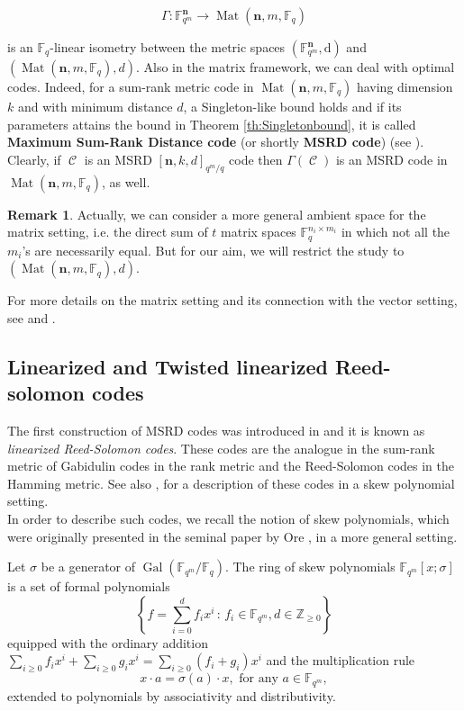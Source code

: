 \documentclass[11pt]{amsart}
\DeclareMathOperator{\C}{\mathcal{C}}
\DeclareMathOperator{\Gal}{Gal}
\DeclareMathOperator{\Mat}{Mat}
\theoremstyle{definition}
\newtheorem{remark}[theorem]{Remark}
\newcommand{\F}{{\mathbb F}}
\newcommand{\Z}{{\mathbb Z}}
\newcommand{\bfn}{\mathbf {n}}
\newcommand{\fq}{{\mathbb F}_{q}}
\newcommand{\Fmnkd}{[\bfn,k,d]_{q^m/q}}
\newcommand{\st}{\,:\,}
\begin{document}
    \begin{equation} \label{eq:isometrymatrixvector}
    \Gamma: \F_{q^m}^\bfn \longrightarrow \Mat(\bfn,m,\F_q)
    \end{equation}
    
is an $\fq$-linear isometry between the metric spaces $(\F_{q^m}^\bfn, \mathrm{d})$ and $(\Mat(\bfn,m,\F_q),d)$. Also in the matrix framework, we can deal with optimal codes. Indeed, for a sum-rank metric code in $\Mat(\bfn,m,\F_q)$ having dimension $k$ and with minimum distance $d$, a Singleton-like bound holds and if its parameters attains the bound in Theorem \ref{th:Singletonbound}, it is called \textbf{Maximum Sum-Rank Distance code} (or shortly \textbf{MSRD code}) (see \cite[Theorem III.2]{byrne2021fundamental}). Clearly, if $\C$ is an MSRD $\Fmnkd$ code then $\Gamma(\C)$ is an MSRD code in $\Mat(\bfn,m,\F_q)$, as well.
     \begin{remark}
Actually, we can consider a more general ambient space for the matrix setting, i.e. the direct sum of $t$ matrix spaces $\F_q^{n_i \times m_i}$ in which not all the $m_i$'s are necessarily equal. But for our aim, we will restrict the study to $(\Mat(\bfn,m,\F_q),d)$. 
  \end{remark}
For more details on the matrix setting and its connection with the vector setting, see \cite{byrne2021fundamental} and \cite{neri2022twisted}. \\



\subsection{Linearized and Twisted linearized Reed-solomon codes}
The first construction of MSRD codes was introduced in \cite{Martinez2018skew} and it is known as \emph{linearized Reed-Solomon codes}. These codes are the analogue in the sum-rank metric of Gabidulin codes in the rank metric and the Reed-Solomon codes in the Hamming metric. See also \cite{neri2022twisted}, for a description of these codes in a skew polynomial setting.
\\

In order to describe such codes, we recall the notion of skew polynomials, which were originally presented in the seminal paper by Ore \cite{ore1933theory}, in a
more general setting. 


Let $\sigma$ be a generator of $\Gal(\F_{q^m}/\F_q)$.
The ring of skew polynomials $\F_{q^m}[x;\sigma]$ is a set of formal polynomials
\[
\left\{f=\sum_{i=0}^d f_i x^i \st f_i \in \F_{q^m}, d \in \Z_{\geq 0} \right\}
\]
equipped with the ordinary addition 
$
\sum_{i \geq 0}f_ix^i+\sum_{i \geq 0}g_ix^i=\sum_{i \geq 0}(f_i+g_i)x^i
$
and the multiplication rule 
\[
x \cdot a=\sigma(a) \cdot x, \mbox{ for any } a \in \F_{q^m},
\]
extended to polynomials by associativity and distributivity.
\end{document}

